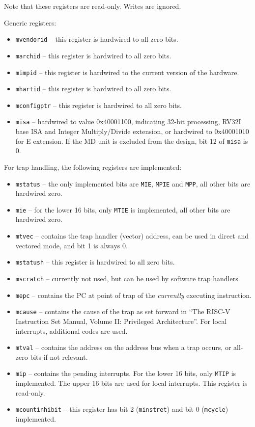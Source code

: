 \documentclass[12pt]{article}
\begin{document}
Note that these registers are read-only. Writes are ignored. 

Generic registers:

\begin{itemize}
\item \lstinline|mvendorid| -- this register is hardwired to all zero bits.
\item \lstinline|marchid| -- this register is hardwired to all zero bits.
\item \lstinline|mimpid| -- this register is hardwired to the current version of the hardware.
\item \lstinline|mhartid| -- this register is hardwired to all zero bits.
\item \lstinline|mconfigptr| -- this register is hardwired to all zero bits.
\item \lstinline|misa| -- hardwired to value 0x40001100, indicating 32-bit processing, RV32I base ISA and Integer Multiply/Divide extension, or hardwired to 0x40001010 for E extension. If the MD unit is excluded from the design, bit 12 of \lstinline|misa| is 0.
\end{itemize}

For trap handling, the following registers are implemented:

\begin{itemize}
\item \lstinline|mstatus| -- the only implemented bits are \lstinline|MIE|, \lstinline|MPIE| and \lstinline|MPP|, all other bits are hardwired zero.
\item \lstinline|mie| -- for the lower 16 bits, only \lstinline|MTIE| is implemented, all other bits are hardwired zero.
\item \lstinline|mtvec| -- contains the trap handler (vector) address, can be used in direct and vectored mode, and bit 1 is always 0.
\item \lstinline|mstatush| -- this register is hardwired to all zero bits.
\item \lstinline|mscratch| -- currently not used, but can be used by software trap handlers.
\item \lstinline|mepc| -- contains the PC at point of trap of the \emph{currently} executing instruction.
\item \lstinline|mcause| -- contains the cause of the trap as set forward in ``The RISC-V Instruction Set Manual, Volume II: Privileged Architecture''. For local interrupts, additional codes are used.
\item \lstinline|mtval| -- contains the address on the address bus when a trap occurs, or all-zero bits if not relevant.
\item \lstinline|mip| -- contains the pending interrupts. For the lower 16 bits, only \lstinline|MTIP| is implemented. The upper 16 bits are used for local interrupts. This register is read-only.
\item \lstinline|mcountinhibit| -- this register has bit 2 (\lstinline|minstret|) and bit 0 (\lstinline|mcycle|) implemented.
\end{itemize}
\end{document}
